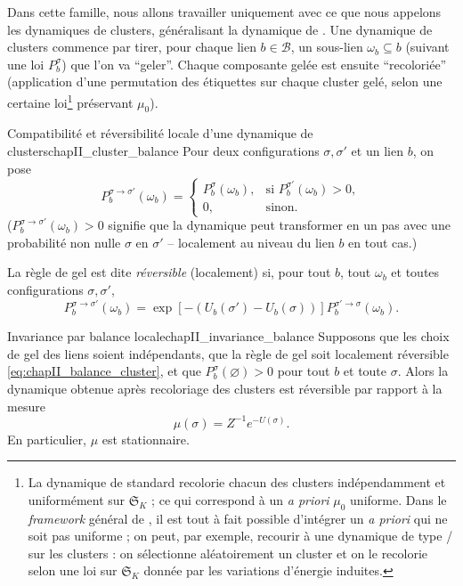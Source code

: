 Dans cette famille, nous allons travailler uniquement avec ce que nous appelons les dynamiques de clusters, généralisant la dynamique de \SW{} \cite{SwendsenWang}. Une dynamique de clusters commence par tirer, pour chaque lien $b \in \mathcal B$, un sous-lien $\omega_b \subseteq b$ (suivant une loi $P_b^\sigma$) que l'on va ``geler''.
Chaque composante gelée est ensuite ``recoloriée'' (application d'une permutation des étiquettes sur chaque cluster gelé, selon une certaine loi\footnote{La dynamique de \SW{} standard recolorie chacun des clusters indépendamment et uniformément sur $\mathfrak S_K$ ; ce qui correspond à un \emph{a priori} $\mu_0$ uniforme. Dans le \emph{framework} général de \ES{} \cite{EdwardsSokal}, il est tout à fait possible d'intégrer un \emph{a priori} qui ne soit pas uniforme ; on peut, par exemple, recourir à une dynamique de type / \cite{GlauberMetropolisDiaconis2009} sur les clusters : on sélectionne aléatoirement un cluster et on le recolorie selon une loi sur $\mathfrak S_K$ donnée par les variations d'énergie induites.} préservant $\mu_0$).

\begin{Definition}{Compatibilité et réversibilité locale d'une dynamique de clusters}{chapII_cluster_balance}
Pour deux configurations $\sigma,\sigma'$ et un lien $b$, on pose
\begin{equation}
    P_b^{\sigma\to\sigma'}(\omega_b)
    =
    \begin{cases}
        P_b^\sigma(\omega_b),&\text{si }P_b^{\sigma'}(\omega_b)>0,\\
        0,&\text{sinon.}
    \end{cases}
    \label{eq:chapII_compatibilite}
\end{equation}
($P_b^{\sigma\to\sigma'}(\omega_b) > 0$ signifie que la dynamique peut transformer en un pas avec une probabilité non nulle $\sigma$ en $\sigma'$ -- localement au niveau du lien $b$ en tout cas.)

La règle de gel est dite \emph{réversible} (localement) si, pour tout $b$, tout $\omega_b$ et toutes configurations $\sigma,\sigma'$,
\begin{equation}
    P_b^{\sigma\to\sigma'}(\omega_b)
    =
    \exp\left[-\left(U_b(\sigma')-U_b(\sigma)\right)\right]
    P_b^{\sigma'\to\sigma}(\omega_b).
    \label{eq:chapII_balance_cluster}
\end{equation}
\end{Definition}

\begin{Theoreme}{Invariance par balance locale}{chapII_invariance_balance}
Supposons que les choix de gel des liens soient indépendants, que la règle de gel soit localement réversible \eqref{eq:chapII_balance_cluster}, et que $P_b^\sigma(\varnothing)>0$ pour tout $b$ et toute $\sigma$. Alors la dynamique obtenue après recoloriage des clusters est réversible par rapport à la mesure
\[
    \mu(\sigma)=Z^{-1}e^{-U(\sigma)}.
\]
En particulier, $\mu$ est stationnaire.
\end{Theoreme}

